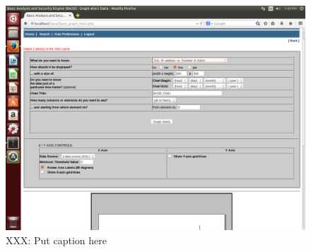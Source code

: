 \begin{figure}[!t]
    \centering
    \includegraphics[width=\columnwidth]{figures/R4_BASE_Report}
    \caption{XXX: Put caption here}
    \label{fig:r4}
\end{figure}



